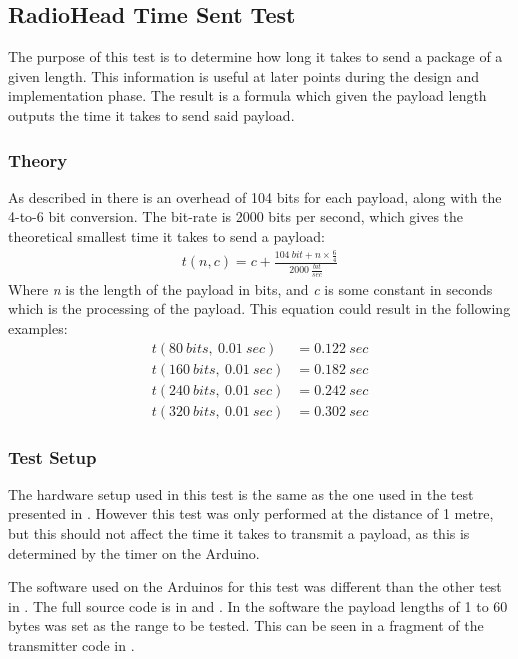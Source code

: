 \subsection{RadioHead Time Sent Test} %
\label{sub:radiohead_time_sent_test}
The purpose of this test is to determine how long it takes to send a package of a given length.
This information is useful at later points during the design and implementation phase. 
The result is a formula which given the payload length outputs the time it takes to send said payload. 

\subsubsection*{Theory}
As described in  there is an overhead of 104 bits for each payload, along with the 4-to-6 bit conversion.
The bit-rate is 2000 bits per second, which gives the theoretical smallest time it takes to send a payload:
\begin{align*}
t(n,c)=c+\frac { 104\ bit+n\times\frac { 6 }{ 4 }}{ 2000\ \frac { bit }{ sec }  } 
\end{align*}
Where \textit{n} is the length of the payload in bits, and \textit{c} is some constant in seconds which is the processing of the payload. This equation could result in the following examples:
\begin{align*}
t(80\ bits,\ 0.01\ sec) &= 0.122\ sec\\
t(160\ bits,\ 0.01\ sec) &= 0.182\ sec\\
t(240\ bits,\ 0.01\ sec) &= 0.242\ sec\\
t(320\ bits,\ 0.01\ sec) &= 0.302\ sec
\end{align*}

\subsubsection*{Test Setup}
The hardware setup used in this test is the same as the one used in the test presented in .
However this test was only performed at the distance of 1 metre, but this should not affect the time it takes to transmit a payload, as this is determined by the timer on the Arduino.

The software used on the Arduinos for this test was different than the other test in . 
The full source code is in  and .
In the software the payload lengths of 1 to 60 bytes was set as the range to be tested. This can be seen in a fragment of the transmitter code in .

